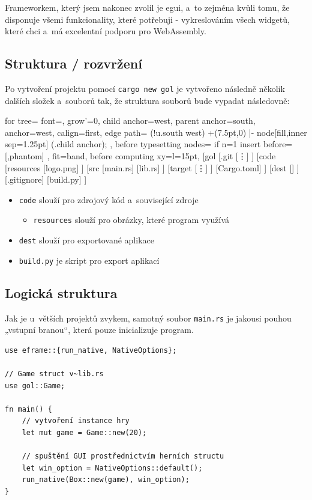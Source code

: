 \documentclass[a4paper, 12pt]{article} %
\begin{document}
		Frameworkem, který jsem nakonec zvolil je egui, a~to zejména kvůli tomu, že disponuje všemi funkcionality, které potřebuji - vykreslováním všech widgetů, které chci a~má excelentní podporu pro WebAssembly.\cite{egui}
	
	\subsection{Struktura / rozvržení}
		Po vytvoření projektu pomocí \texttt{cargo new gol} je vytvořeno následně několik dalších složek a~souborů tak, že struktura souborů bude vypadat následovně:
		\begin{center}
		\begin{forest}
			for tree={
			font=\ttfamily,
			grow'=0,
			child anchor=west,
			parent anchor=south,
			anchor=west,
			calign=first,
			edge path={
				\noexpand{}
				(!u.south west) +(7.5pt,0) |- node[fill,inner sep=1.25pt] {} (.child anchor);
			},
			before typesetting nodes={
				if n=1
				{insert before={[,phantom]}}
				{}
			},
			fit=band,
			before computing xy={l=15pt},
			}
		[gol
			[.git
			[\vdots]
			]
			[code
			[resources
				[logo.png]
			]
			[src
				[main.rs]
				[lib.rs]
			]
			[target
				[\vdots]
			]
			[Cargo.toml]
			]
			[dest
			[]
			]
			[.gitignore]
			[build.py]
		]
		\end{forest}
		\end{center}

		\begin{itemize}
			\item \texttt{code} slouží pro zdrojový kód a~související zdroje
			\begin{itemize}
				\item \texttt{resources} slouží pro obrázky, které program využívá
			\end{itemize}
			\item \texttt{dest} slouží pro exportované aplikace
			\item \texttt{build.py} je skript pro export aplikací
		\end{itemize}
		
	\subsection{Logická struktura}
		Jak je u~větších projektů zvykem, samotný soubor \texttt{main.rs} je jakousi pouhou „vstupní branou“, která pouze inicializuje program. 
		
		\begin{verbatim}
use eframe::{run_native, NativeOptions};

// Game struct v~lib.rs
use gol::Game;

fn main() {
	// vytvoření instance hry
	let mut game = Game::new(20);

	// spuštění GUI prostřednictvím herních structu
	let win_option = NativeOptions::default();
	run_native(Box::new(game), win_option);
}
		\end{verbatim}
		
\end{document}
